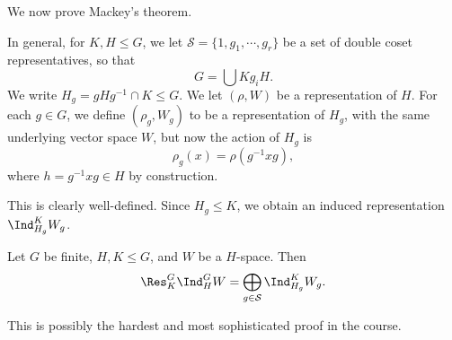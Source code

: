 \documentclass[a4paper]{article}
\begin{document}
We now prove Mackey's theorem.
\begin{thm}
  In general, for $K, H \leq G$, we let $\mathcal{S} = \{1, g_1, \cdots, g_r\}$ be a set of double coset representatives, so that
  \[
    G = \bigcup K g_i H.
  \]
  We write $H_g = gHg^{-1} \cap K \leq G$. We let $(\rho, W)$ be a representation of $H$. For each $g \in G$, we define $(\rho_g, W_g)$ to be a representation of $H_g$, with the same underlying vector space $W$, but now the action of $H_g$ is
  \[
    \rho_g(x) = \rho(g^{-1} xg),
  \]
  where $h = g^{-1}xg \in H$ by construction.

  This is clearly well-defined. Since $H_g \leq K$, we obtain an induced representation $\Ind_{H_g}^K W_g$.

  Let $G$ be finite, $H, K \leq G$, and $W$ be a $H$-space. Then
  \[
    \Res_K^G \Ind_H^G W = \bigoplus_{g \in \mathcal{S}} \Ind_{H_g}^K W_g.
  \]
\end{thm}
This is possibly the hardest and most sophisticated proof in the course.
\end{document}
